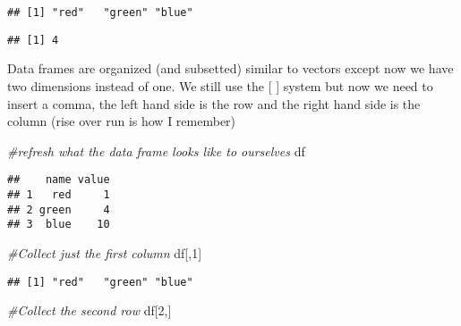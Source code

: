 \documentclass[
]{article}
\newenvironment{Shaded}{\begin{snugshade}}{\end{snugshade}}
\newcommand{\CommentTok}[1]{\textcolor[rgb]{0.56,0.35,0.01}{\textit{#1}}}
\newcommand{\DecValTok}[1]{\textcolor[rgb]{0.00,0.00,0.81}{#1}}
\newcommand{\FunctionTok}[1]{\textcolor[rgb]{0.13,0.29,0.53}{\textbf{#1}}}
\newcommand{\NormalTok}[1]{#1}
\newcommand{\SpecialCharTok}[1]{\textcolor[rgb]{0.81,0.36,0.00}{\textbf{#1}}}
\begin{document}
\begin{Shaded}
\end{Shaded}

\begin{verbatim}
## [1] "red"   "green" "blue"
\end{verbatim}

\begin{Shaded}
\end{Shaded}

\begin{verbatim}
## [1] 4
\end{verbatim}

Data frames are organized (and subsetted) similar to vectors except now
we have two dimensions instead of one. We still use the {[} {]} system
but now we need to insert a comma, the left hand side is the row and the
right hand side is the column (rise over run is how I remember)

\begin{Shaded}
\begin{Highlighting}[]
\CommentTok{\#refresh what the data frame looks like to ourselves}
\NormalTok{df }
\end{Highlighting}
\end{Shaded}

\begin{verbatim}
##    name value
## 1   red     1
## 2 green     4
## 3  blue    10
\end{verbatim}

\begin{Shaded}
\begin{Highlighting}[]
\CommentTok{\#Collect just the first column}
\NormalTok{df[,}\DecValTok{1}\NormalTok{]}
\end{Highlighting}
\end{Shaded}

\begin{verbatim}
## [1] "red"   "green" "blue"
\end{verbatim}

\begin{Shaded}
\begin{Highlighting}[]
\CommentTok{\#Collect the second row}
\NormalTok{df[}\DecValTok{2}\NormalTok{,]}
\end{Highlighting}
\end{Shaded}
\end{document}
